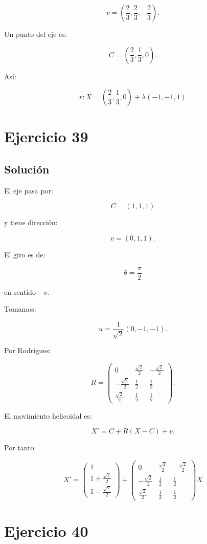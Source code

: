 \documentclass[11pt,a4paper]{article}
\begin{document}
\[
\boxed{
v=
\left(
\frac23,\frac23,-\frac23
\right).
}
\]

Un punto del eje es:

\[
C=
\left(
\frac23,\frac13,0
\right).
\]

Así:

\[
\boxed{
r:
X=
\left(
\frac23,\frac13,0
\right)
+
\lambda(-1,-1,1)
}
\]

\section{Ejercicio 39}
\subsection{Solución}

El eje pasa por:

\[
C=(1,1,1)
\]

y tiene dirección:

\[
v=(0,1,1).
\]

El giro es de:

\[
\theta=\frac{\pi}{2}
\]

en sentido \(-v\).

Tomamos:

\[
u=
\frac1{\sqrt2}(0,-1,-1).
\]

Por Rodrigues:

\[
R=
\begin{pmatrix}
0&\frac{\sqrt2}{2}&-\frac{\sqrt2}{2}\\[1mm]
-\frac{\sqrt2}{2}&\frac12&\frac12\\[1mm]
\frac{\sqrt2}{2}&\frac12&\frac12
\end{pmatrix}.
\]

El movimiento helicoidal es:

\[
X'=C+R(X-C)+v.
\]

Por tanto:

\[
\boxed{
X'
=
\begin{pmatrix}
1\\[1mm]
1+\frac{\sqrt2}{2}\\[1mm]
1-\frac{\sqrt2}{2}
\end{pmatrix}
+
\begin{pmatrix}
0&\frac{\sqrt2}{2}&-\frac{\sqrt2}{2}\\[1mm]
-\frac{\sqrt2}{2}&\frac12&\frac12\\[1mm]
\frac{\sqrt2}{2}&\frac12&\frac12
\end{pmatrix}
X
}
\]

\section{Ejercicio 40}
\end{document}
